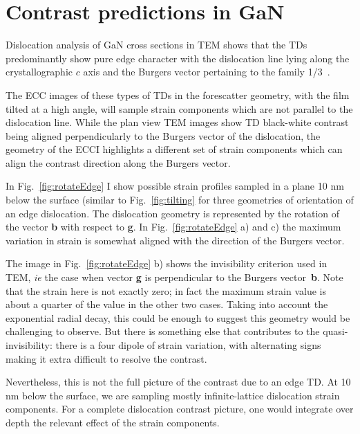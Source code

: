 \pagebreak

\section{Contrast predictions in GaN}
\label{sec:contrastGaN}
Dislocation analysis of GaN cross sections in TEM shows that the TDs predominantly show pure edge character with the dislocation line lying along the crystallographic $c$ axis and the Burgers vector pertaining to the family  1/3~\cite{Hino00}.

The ECC images of these types of TDs in the forescatter geometry, with the film tilted at a high angle, will sample strain components which are not parallel to the dislocation line. While the plan view TEM images show TD black-white contrast being aligned perpendicularly to the  Burgers vector of the dislocation, the geometry of the ECCI highlights a different set of strain components which can align the contrast direction along the Burgers vector.

In Fig.~\ref{fig:rotateEdge} I show possible strain profiles sampled in a plane 10 nm below the surface (similar to Fig.~\ref{fig:tilting} for three geometries of orientation of an edge dislocation. The dislocation geometry is represented by the rotation of the vector \textbf{b} with respect to \textbf{g}. In Fig.~\ref{fig:rotateEdge} a) and c) the maximum variation in strain is somewhat aligned with the direction of the Burgers vector. 

The image in Fig.~\ref{fig:rotateEdge} b) shows the invisibility criterion used in TEM, \textit{ie} the case when vector \textbf{g} is perpendicular to the Burgers vector~\textbf{b}. Note that the strain here is not exactly zero; in fact the maximum strain value is about a quarter of the value in the other two cases. Taking into account the exponential radial decay, this could be enough to suggest this geometry would be challenging to observe. But there is something else that contributes to the quasi-invisibility: there is a four dipole of strain variation, with alternating signs making it extra difficult to resolve the contrast.  

Nevertheless, this is not the full picture of the contrast due to an edge TD. At 10 nm below the surface, we are sampling mostly infinite-lattice dislocation strain components. For a complete dislocation contrast picture, one would integrate over depth the relevant effect of the strain components.

\clearpage

